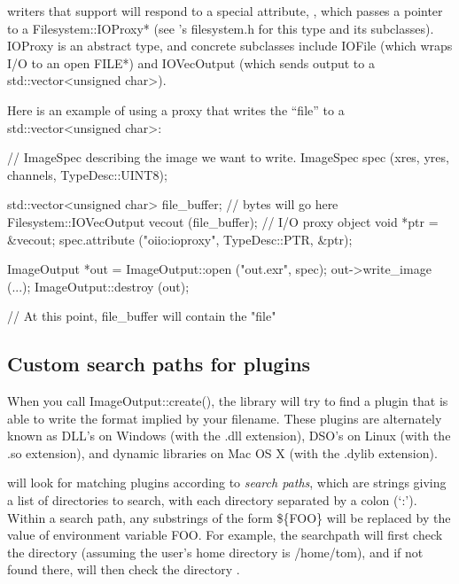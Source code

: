 \ImageOutput writers that support  will respond to a special
attribute, , which passes a pointer to a {\cf
Filesystem::IOProxy*} (see \product's {\cf filesystem.h} for this type and
its subclasses). {\cf IOProxy} is an abstract type, and concrete subclasses
include {\cf IOFile} (which wraps I/O to an open {\cf FILE*}) and {\cf
IOVecOutput} (which sends output to a {\cf std::vector<unsigned char>}).

Here is an example of using a proxy that writes the ``file'' to a
{\cf std::vector<unsigned char>}:

\begin{code}
    // ImageSpec describing the image we want to write.
    ImageSpec spec (xres, yres, channels, TypeDesc::UINT8);

    std::vector<unsigned char> file_buffer;  // bytes will go here
    Filesystem::IOVecOutput vecout (file_buffer);  // I/O proxy object
    void *ptr = &vecout;
    spec.attribute ("oiio:ioproxy", TypeDesc::PTR, &ptr);

    ImageOutput *out = ImageOutput::open ("out.exr", spec);
    out->write_image (...);
    ImageOutput::destroy (out);

    // At this point, file_buffer will contain the "file"
\end{code}



\subsection{Custom search paths for plugins}
\label{sec:imageoutput:searchpaths}

When you call {\cf ImageOutput::create()}, the \product library will try
to find a plugin that is able to write the format implied by your
filename.  These plugins are alternately known as DLL's on Windows (with
the {\cf .dll} extension), DSO's on Linux (with the {\cf .so}
extension), and dynamic libraries on Mac OS X (with the {\cf .dylib}
extension).  

\product will look for matching plugins according to
\emph{search paths}, which are strings giving a list of directories to
search, with each directory separated by a colon (`{\cf :}').  Within
a search path, any
substrings of the form {\cf \$\{FOO\}} will be replaced
by the value of environment variable {\cf FOO}.  For
example, the searchpath 
will first check the directory  (assuming the
user's home directory is {\cf /home/tom}), and if not
found there, will then check the directory .

